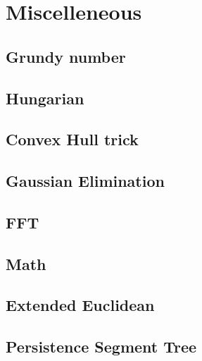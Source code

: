 \documentclass[10pt,landscape,a4paper,twocolumn]{article}
\begin{document}
\section{Miscelleneous}
\subsection{Grundy number}


\subsection{Hungarian}


\subsection{Convex Hull trick}


\subsection{Gaussian Elimination}


\subsection{FFT}


\subsection{Math}


\subsection{Extended Euclidean}


\subsection{Persistence Segment Tree}

\end{document}
